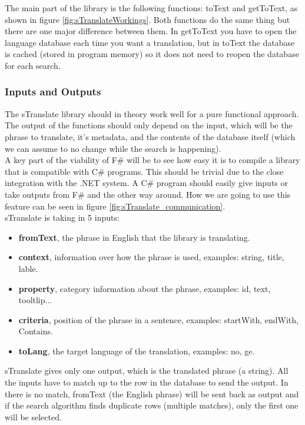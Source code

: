 \documentclass[12pt, a4paper]{article}
\begin{document}
The main part of the library is the following functions: toText and getToText, as shown in figure \ref{fig:sTranslateWorkings}. Both functions do the same thing but there are one major difference between them. In getToText you have to open the language database each time you want a translation, but in toText the database is cached (stored in program memory) so it does not need to reopen the database for each search.\\

\newpage
\subsubsection{Inputs and Outputs}
The sTranslate library should in theory work well for a pure functional approach. The output of the functions should only depend on the input, which will be the phrase to translate, it's metadata, and the contents of the database itself (which we can assume to no change while the search is happening).\\

A key part of the viability of F\# will be to see how easy it is to compile a library that is compatible with C\# programs. This should be trivial due to the close integration with the .NET system. A C\# program should easily give inputs or take outputs from F\# and the other way around. How we are going to use this feature can be seen in figure \ref{fig:sTranslate_communication}.\\

sTranslate is taking in 5 inputs:

\begin{itemize}
	\item \textbf{fromText}, the phrase in English that the library is translating. 
	\item \textbf{context}, information over how the phrase is used, examples: string, title, lable.  
	\item \textbf{property}, category information about the phrase, examples: id, text, tooltlip...  
	\item \textbf{criteria}, position of the phrase in a sentence, examples: startWith, endWith, Contains.
	\item \textbf{toLang}, the target language of the translation, examples: no, ge.
\end{itemize}

sTranslate gives only one output, which is the translated phrase (a string). All the inputs have to match up to the row in the database to send the output. In there is no match, fromText (the English phrase) will be sent back as output and if the search algorithm finds duplicate rows (multiple matches), only the first one will be selected.\\
\end{document}
